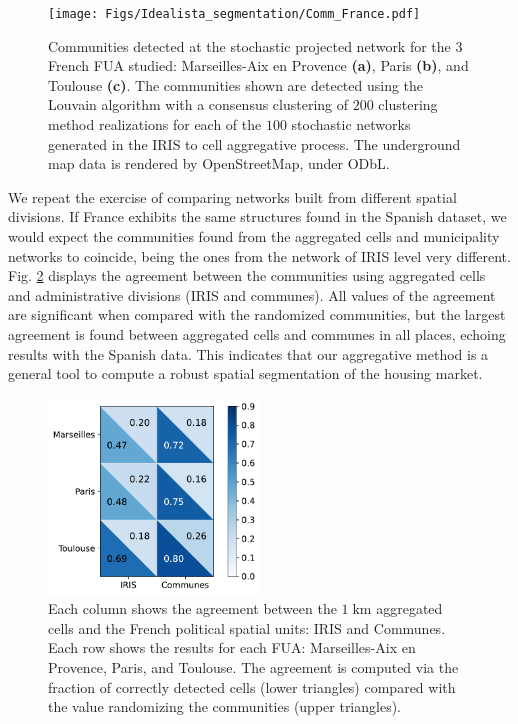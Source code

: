 \begin{figure}
    \centering
    \texttt{[image: Figs/Idealista\_segmentation/Comm\_France.pdf]}
	\caption[Spatial segmentation for $1 \; \textrm{km}$ aggregated cells constructed from IRIS level data for France.]{ Communities detected at the stochastic projected network for the 3 French FUA studied: Marseilles-Aix en Provence \textbf{(a)}, Paris \textbf{(b)}, and Toulouse \textbf{(c)}. The communities shown are detected using the Louvain algorithm with a consensus clustering of $200$ clustering method realizations for each of the $100$ stochastic networks generated in the IRIS to cell aggregative process. The underground map data is rendered by OpenStreetMap, under ODbL. \label{fig:france_comm}}
\end{figure}

We repeat the exercise of comparing networks built from different spatial divisions. If France exhibits the same structures found in the Spanish dataset, we would expect the communities found from the aggregated cells and municipality networks to coincide, being the ones from the network of IRIS level very different. Fig. \ref{fig:Compare_france} displays the agreement between the communities using aggregated cells and administrative divisions (IRIS and communes). All values of the agreement are significant when compared with the randomized communities, but the largest agreement is found between aggregated cells and communes in all places, echoing results with the Spanish data. This indicates that our aggregative method is a general tool to compute a robust spatial segmentation of the housing market.

\begin{figure}[ht]
    \centering
    \includegraphics[width = 0.5\textwidth]{Figs/Idealista_segmentation/Cells_agreement_different_topologies_France.pdf}
	\caption[Comparison between the $1 \; \textrm{km}$ aggregated cells communities and the political units communities in France.]{ Each column shows the agreement between the $1 \; \textrm{km}$ aggregated cells and the French political spatial units: IRIS and Communes. Each row shows the results for each FUA: Marseilles-Aix en Provence, Paris, and Toulouse. The agreement is computed via the fraction of correctly detected cells (lower triangles) compared with the value randomizing the communities (upper triangles). \label{fig:Compare_france}}
\end{figure}


